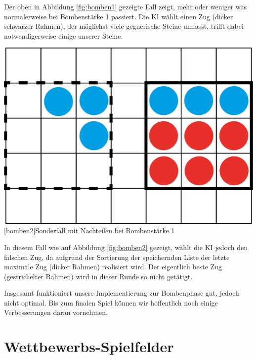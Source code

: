 \documentclass[12pt,a4paper,bibliography=totocnumbered,listof=totocnumbered]{scrartcl}
\begin{document}
	Der oben in Abbildung \ref{fig:bomben1} gezeigte Fall zeigt, mehr oder weniger was normalerweise bei Bombenstärke 1 passiert. Die KI wählt einen Zug (dicker schwarzer Rahmen), der möglichst viele gegnerische Steine umfasst, trifft dabei notwendigerweise einige unserer Steine.

	
	\vspace{1em}
	\begin{minipage}{\linewidth}
		\centering
		\includegraphics[width=0.6\linewidth]{pics/Kapitel_5/Kapitel_5_pic2.png}
		[bomben2]{Sonderfall mit Nachteilen bei Bombenstärke 1}
		\label{fig:bomben2}
	\end{minipage}
	\vspace{1em}
	
	In diesem Fall wie auf Abbildung \ref{fig:bomben2} gezeigt, wählt die KI jedoch den falschen Zug, da aufgrund der Sortierung der speichernden Liste der letzte maximale Zug (dicker Rahmen) realisiert wird. Der eigentlich beste Zug (gestrichelter Rahmen) wird in dieser Runde so nicht getätigt.
	
	Insgesamt funktioniert unsere Implementierung zur Bombenphase gut, jedoch nicht optimal. Bis zum finalen Spiel können wir hoffentlich noch einige Verbesserungen daran vornehmen.
	
	\newpage
    
    \section{Wettbewerbs-Spielfelder}
    \vspace{1em}
\end{document}
